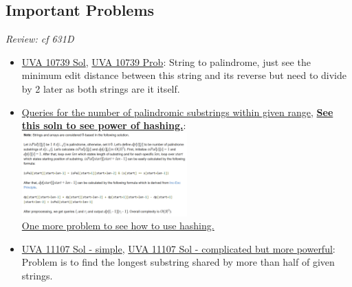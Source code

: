 \documentclass[8pt, a4paper, oneside, twocolumn]{extarticle}
\begin{document}
\subsection{Important Problems}
\textit{Review: cf 631D}
\begin{itemize}
	\item \href {https://github.com/sourabh2311/Competitive-Programming/blob/master/UVA_10739.cpp}{UVA 10739 Sol}, \href {https://uva.onlinejudge.org/external/107/10739.pdf}{UVA 10739 Prob}: String to palindrome, just see the minimum edit distance between this string and its reverse but need to divide by 2 later as both strings are it itself.	
	\item \href {https://codeforces.com/contest/245/problem/H}{Queries for the number of palindromic substrings within given range}, \href {https://github.com/sourabh2311/Competitive-Programming/blob/master/IMP%20QUES/Suffix%20String%20Structure/Hash/245H%20-%20Queries%20for%20Number%20of%20Palindromes.cpp}{\textbf {See this soln to see power of hashing.}}: 
    \\\includegraphics[width=0.5\textwidth,height=0.5\textheight,keepaspectratio]{palsub} 	
    \\\href {https://github.com/sourabh2311/Competitive-Programming/blob/master/IMP%20QUES/Suffix%20String%20Structure/Hash/514C%20-%20Watto%20And%20Mechanism.cpp}{One more problem to see how to use hashing.}
	\item \href {https://github.com/sourabh2311/Competitive-Programming/blob/master/HimanshuSA11107.cpp}{UVA 11107 Sol - simple}, \href {https://github.com/sourabh2311/Competitive-Programming/blob/master/HimanshuSA11107.cpp}{UVA 11107 Sol - complicated but more powerful}: Problem is to find the longest substring shared by more than half of given strings.	
\end{itemize}
\end{document}
